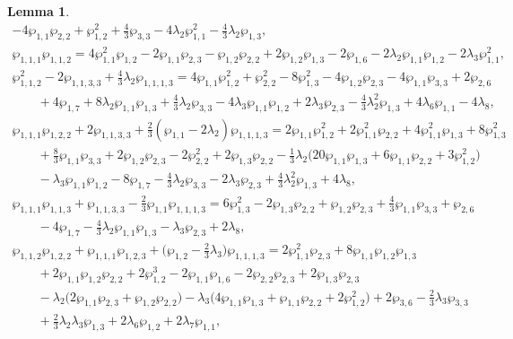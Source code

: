 \documentclass[pdftex]{sigma}
\numberwithin{equation}{section}
\newtheorem{Lemma}[Theorem]{Lemma}
\begin{document}
\begin{Lemma}
\begin{gather*}
 - 4 \wp_{1,1} \wp_{2,2} + \wp_{1,2}^2 + \tfrac{4}{3} \wp_{3,3} - 4\lambda_2 \wp_{1,1}^2 - \tfrac{4}{3}\lambda_2 \wp_{1,3},\\
 \wp_{1,1,1}\wp_{1,1,2} = 4 \wp_{1,1}^2 \wp_{1,2} - 2 \wp_{1,1} \wp_{2,3} - \wp_{1,2} \wp_{2,2} + 2 \wp_{1,2} \wp_{1,3}
 - 2\wp_{1,6} - 2 \lambda_2 \wp_{1,1} \wp_{1,2} - 2\lambda_3 \wp_{1,1}^2, \\
 \wp_{1,1,2}^2 - 2 \wp_{1,1,3,3} + \tfrac{4}{3} \lambda_2 \wp_{1,1,1,3} = 4 \wp_{1,1} \wp_{1,2}^2
 + \wp_{2,2}^2 - 8 \wp_{1,3}^2 - 4 \wp_{1,2} \wp_{2,3} - 4\wp_{1,1} \wp_{3,3} + 2\wp_{2,6} \\
 \qquad{} + 4\wp_{1,7} + 8 \lambda_2 \wp_{1,1} \wp_{1,3} + \tfrac{4}{3} \lambda_2 \wp_{3,3} - 4 \lambda_3 \wp_{1,1} \wp_{1,2}
 + 2\lambda_3 \wp_{2,3} - \tfrac{4}{3} \lambda_2^2 \wp_{1,3} + 4\lambda_6 \wp_{1,1} - 4\lambda_8,\\
 \wp_{1,1,1}\wp_{1,2,2} + 2 \wp_{1,1,3,3} + \tfrac{2}{3} (\wp_{1,1} - 2\lambda_2) \wp_{1,1,1,3} =
 2\wp_{1,1}\wp_{1,2}^2 + 2\wp_{1,1}^2 \wp_{2,2} + 4 \wp_{1,1}^2 \wp_{1,3} + 8\wp_{1,3}^2 \\
 \qquad{} + \tfrac{8}{3} \wp_{1,1} \wp_{3,3} + 2 \wp_{1,2} \wp_{2,3}
 - 2\wp_{2,2}^2 + 2 \wp_{1,3} \wp_{2,2} - \tfrac{1}{3} \lambda_2 \big(20 \wp_{1,1} \wp_{1,3}
 + 6 \wp_{1,1} \wp_{2,2} + 3 \wp_{1,2}^2 \big) \\
 \qquad{} - \lambda_3 \wp_{1,1} \wp_{1,2} - 8 \wp_{1,7} - \tfrac{4}{3} \lambda_2 \wp_{3,3} -2\lambda_3 \wp_{2,3}
 + \tfrac{4}{3} \lambda_2^2 \wp_{1,3} + 4 \lambda_8,\\
 \wp_{1,1,1}\wp_{1,1,3} + \wp_{1,1,3,3} - \tfrac{2}{3} \wp_{1,1} \wp_{1,1,1,3} =
 6 \wp_{1,3}^2 - 2 \wp_{1,3} \wp_{2,2} + \wp_{1,2} \wp_{2,3}
 + \tfrac{4}{3} \wp_{1,1} \wp_{3,3} + \wp_{2,6} \\
 \qquad{} - 4 \wp_{1,7} - \tfrac{4}{3} \lambda_2 \wp_{1,1}\wp_{1,3} - \lambda_3 \wp_{2,3}+2\lambda_8,\\
 \wp_{1,1,2}\wp_{1,2,2} + \wp_{1,1,1}\wp_{1,2,3} + \big(\wp_{1,2} - \tfrac{2}{3}\lambda_3\big) \wp_{1,1,1,3} =
 2\wp_{1,1}^2 \wp_{2,3} + 8 \wp_{1,1} \wp_{1,2} \wp_{1,3} \\
 \qquad{} + 2 \wp_{1,1} \wp_{1,2} \wp_{2,2} + 2 \wp_{1,2}^3 - 2 \wp_{1,1} \wp_{1,6} - 2 \wp_{2,2} \wp_{2,3} + 2 \wp_{1,3} \wp_{2,3}\\
 \qquad{} - \lambda_2 \big(2\wp_{1,1}\wp_{2,3} + \wp_{1,2} \wp_{2,2}\big)- \lambda_3 \big(4\wp_{1,1}\wp_{1,3} + \wp_{1,1} \wp_{2,2} + 2 \wp_{1,2}^2 \big) + 2\wp_{3,6} -\tfrac{2}{3} \lambda_3 \wp_{3,3}\\
 \qquad{}+\tfrac{2}{3}\lambda_2 \lambda_3 \wp_{1,3} + 2 \lambda_6 \wp_{1,2} + 2 \lambda_7 \wp_{1,1}, \\

\end{gather*}
\end{Lemma}
\end{document}
